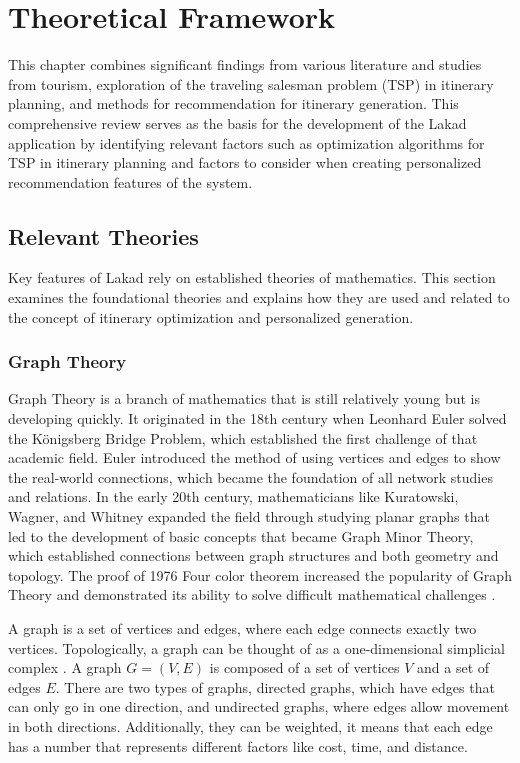\chapter{Theoretical Framework}
\thispagestyle{empty}
This chapter combines significant findings from various literature and studies from tourism, exploration of the traveling salesman problem (TSP) in itinerary planning, and methods for recommendation for itinerary generation. This comprehensive review serves as the basis for the development of the Lakad application by identifying relevant factors such as optimization algorithms for TSP in itinerary planning and factors to consider when creating personalized recommendation features of the system.

\section{Relevant Theories}
Key features of Lakad rely on established theories of mathematics. This section examines the foundational theories and explains how they are used and related to the concept of itinerary optimization and personalized generation.

\subsection{Graph Theory}
Graph Theory is a branch of mathematics that is still relatively young but is developing quickly. It originated in the 18th century when Leonhard Euler solved the Königsberg Bridge Problem, which established the first challenge of that academic field. Euler introduced the method of using vertices and edges to show the real-world connections, which became the foundation of all network studies and relations. In the early 20th century, mathematicians like Kuratowski, Wagner, and Whitney expanded the field through studying planar graphs that led to the development of basic concepts that became Graph Minor Theory, which established connections between graph structures and both geometry and topology. The proof of 1976 Four color theorem increased the popularity of Graph Theory and demonstrated its ability to solve difficult mathematical challenges \parencite{Carmesin2022}.

A graph is a set of vertices and edges, where each edge connects exactly two vertices. Topologically, a graph can be thought of as a one-dimensional simplicial complex \parencite{Carmesin2022}. A graph $G=(V,E)$ is composed of a set of vertices $V$ and a set of edges $E$. There are two types of graphs, directed graphs, which have edges that can only go in one direction, and undirected graphs, where edges allow movement in both directions. Additionally, they can be weighted, it means that each edge has a number that represents different factors like cost, time, and distance.

